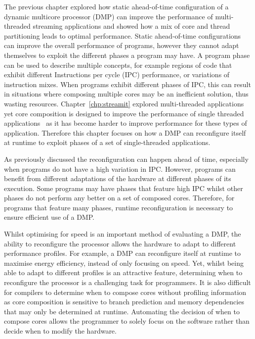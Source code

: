 The previous chapter explored how static ahead-of-time configuration of a dynamic multicore processor (DMP) can improve the performance of multi-threaded streaming applications and showed how a mix of core and thread partitioning leads to optimal performance.
Static ahead-of-time configurations can improve the overall performance of programs, however they cannot adapt themselves to exploit the different phases a program may have.
A program phase can be used to describe multiple concepts, for example regions of code that exhibit different Instructions per cycle (IPC) performance, or variations of instruction mixes.
When programs exhibit different phases of IPC, this can result in situations where composing multiple cores may be an inefficient solution, thus wasting resources.
Chapter~\ref{chp:streamit} explored multi-threaded applications yet core composition is designed to improve the performance of single threaded applications~\cite{ipek2007CoreFusion} as it has become harder to improve performance for these types of application.
Therefore this chapter focuses on how a DMP can reconfigure itself at runtime to exploit phases of a set of single-threaded applications.

As previously discussed the reconfiguration can happen ahead of time, especially when programs do not have a high variation in IPC.
However, programs can benefit from different adaptations of the hardware at different phases of its execution.
Some programs may have phases that feature high IPC whilst other phases do not perform any better on a set of composed cores.
Therefore, for programs that feature many phases, runtime reconfiguration is necessary to ensure efficient use of a DMP.

Whilst optimising for speed is an important method of evaluating a DMP, the ability to reconfigure the processor allows the hardware to adapt to different performance profiles.
For example, a DMP can reconfigure itself at runtime to maximise energy efficiency, instead of only focusing on speed.
Yet, whilst being able to adapt to different profiles is an attractive feature, determining when to reconfigure the processor is a challenging task for programmers.
It is also difficult for compilers to determine when to compose cores without profiling information as core composition is sensitive to branch prediction and memory dependencies that may only be determined at runtime.%
Automating the decision of when to compose cores allows the programmer to solely focus on the software rather than decide when to modify the hardware.

